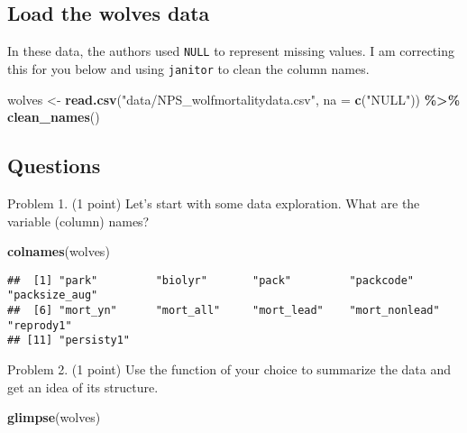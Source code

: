 \documentclass[
]{article}
\newenvironment{Shaded}{\begin{snugshade}}{\end{snugshade}}
\newcommand{\AttributeTok}[1]{\textcolor[rgb]{0.13,0.29,0.53}{#1}}
\newcommand{\FunctionTok}[1]{\textcolor[rgb]{0.13,0.29,0.53}{\textbf{#1}}}
\newcommand{\NormalTok}[1]{#1}
\newcommand{\OtherTok}[1]{\textcolor[rgb]{0.56,0.35,0.01}{#1}}
\newcommand{\SpecialCharTok}[1]{\textcolor[rgb]{0.81,0.36,0.00}{\textbf{#1}}}
\newcommand{\StringTok}[1]{\textcolor[rgb]{0.31,0.60,0.02}{#1}}
\begin{document}
\hypertarget{load-the-wolves-data}{%
\subsection{Load the wolves data}\label{load-the-wolves-data}}

In these data, the authors used \texttt{NULL} to represent missing
values. I am correcting this for you below and using \texttt{janitor} to
clean the column names.

\begin{Shaded}
\begin{Highlighting}[]
\NormalTok{wolves }\OtherTok{\textless{}{-}} \FunctionTok{read.csv}\NormalTok{(}\StringTok{"data/NPS\_wolfmortalitydata.csv"}\NormalTok{, }\AttributeTok{na =} \FunctionTok{c}\NormalTok{(}\StringTok{"NULL"}\NormalTok{)) }\SpecialCharTok{\%\textgreater{}\%} \FunctionTok{clean\_names}\NormalTok{()}
\end{Highlighting}
\end{Shaded}

\hypertarget{questions}{%
\subsection{Questions}\label{questions}}

Problem 1. (1 point) Let's start with some data exploration. What are
the variable (column) names?

\begin{Shaded}
\begin{Highlighting}[]
\FunctionTok{colnames}\NormalTok{(wolves)}
\end{Highlighting}
\end{Shaded}

\begin{verbatim}
##  [1] "park"         "biolyr"       "pack"         "packcode"     "packsize_aug"
##  [6] "mort_yn"      "mort_all"     "mort_lead"    "mort_nonlead" "reprody1"    
## [11] "persisty1"
\end{verbatim}

Problem 2. (1 point) Use the function of your choice to summarize the
data and get an idea of its structure.

\begin{Shaded}
\begin{Highlighting}[]
\FunctionTok{glimpse}\NormalTok{(wolves)}
\end{Highlighting}
\end{Shaded}
\end{document}
